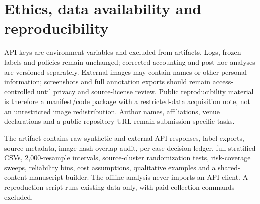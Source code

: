 \documentclass[10pt]{article}
\begin{document}
\section*{Ethics, data availability and reproducibility}
API keys are environment variables and excluded from artifacts. Logs, frozen labels and policies remain unchanged; corrected accounting and post-hoc analyses are versioned separately. External images may contain names or other personal information; screenshots and full annotation exports should remain access-controlled until privacy and source-license review. Public reproducibility material is therefore a manifest/code package with a restricted-data acquisition note, not an unrestricted image redistribution. Author names, affiliations, venue declarations and a public repository URL remain submission-specific tasks.

The artifact contains raw synthetic and external API responses, label exports, source metadata, image-hash overlap audit, per-case decision ledger, full stratified CSVs, 2,000-resample intervals, source-cluster randomization tests, risk-coverage sweeps, reliability bins, cost assumptions, qualitative examples and a shared-content manuscript builder. The offline analysis never imports an API client. A reproduction script runs existing data only, with paid collection commands excluded.
\end{document}
